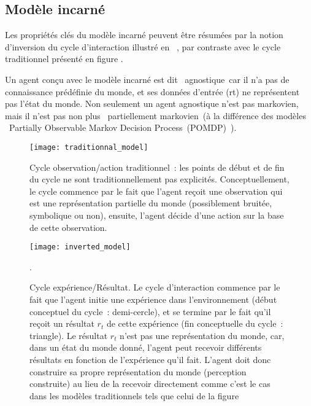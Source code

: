 \documentclass{llncs}
\begin{document}
\subsection{Modèle incarné}
\label{par:model_incarne}
Les propriétés clés du modèle incarné peuvent être résumées par la notion d'inversion du cycle d'interaction illustré en ~\cite{georgeon2014inverting,varelarosch}, par contraste avec le cycle traditionnel présenté en figure . 

Un agent conçu avec le modèle incarné est dit \og~agnostique~\fg car il n'a pas de connaissance prédéfinie du monde, et ses données d'entrée (rt) ne représentent pas l'état du monde. Non seulement un agent agnostique n'est pas markovien, mais il n'est pas non plus \og~partiellement markovien~\fg (à la différence des modèles \og~Partially Observable Markov Decision Process~\fg (POMDP)~\cite{Cassandra1994}).

\begin{figure}
	\centering
	\texttt{[image: traditionnal\_model]}
	\caption{Cycle observation/action traditionnel~: les points de début et de fin du cycle ne sont traditionnellement pas explicités. Conceptuellement, le cycle commence par le fait que l'agent reçoit une observation qui est une représentation partielle du monde (possiblement bruitée, symbolique ou non), ensuite, l'agent décide d'une action sur la base de cette observation.}
	\label{fig:traditionnal_model}
\end{figure}

\begin{figure}
	\centering
	\texttt{[image: inverted\_model]}
	\caption{Cycle expérience/Résultat. Le cycle d'interaction commence par le fait que l'agent initie une expérience dans l'environnement (début conceptuel du cycle~: demi-cercle), et se termine par le fait qu'il reçoit un résultat $r_{t}$ de cette expérience (fin conceptuelle du cycle~: triangle). Le résultat $r_{t}$ n'est pas une représentation du monde, car, dans un état du monde donné, l'agent peut recevoir différents résultats en fonction de l'expérience qu'il fait. L'agent doit donc construire sa propre représentation du monde (perception construite) au lieu de la recevoir directement comme c'est le cas dans les modèles traditionnels tels que celui de la figure~}.
	\label{fig:inverted_model}
\end{figure}
\end{document}
